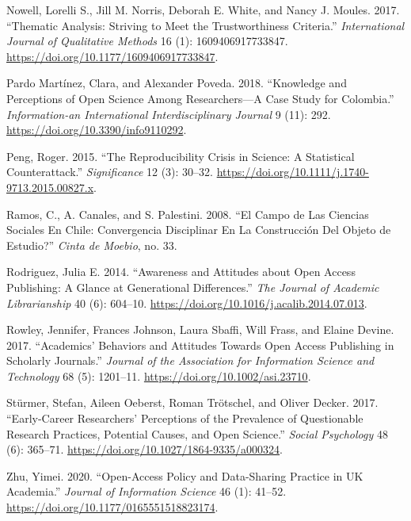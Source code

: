 \documentclass[
  letterpaper,
  DIV=11,
  numbers=noendperiod]{scrartcl}
\newlength{\cslhangindent}
\newlength{\cslentryspacingunit} %
\newenvironment{CSLReferences}[2] %
 {%
  \setlength{\parindent}{0pt}
  \ifodd #1
  \let\oldpar\par
  \def\par{\hangindent=\cslhangindent\oldpar}
  \fi
  \setlength{\parskip}{#2\cslentryspacingunit}
 }%
 {}
\begin{document}
\begin{CSLReferences}{1}{0}
\leavevmode{}%
Nowell, Lorelli S., Jill M. Norris, Deborah E. White, and Nancy J.
Moules. 2017. {``Thematic {Analysis}: {Striving} to {Meet} the
{Trustworthiness Criteria}.''} \emph{International Journal of
Qualitative Methods} 16 (1): 1609406917733847.
\url{https://doi.org/10.1177/1609406917733847}.

\leavevmode{}%
Pardo Martínez, Clara, and Alexander Poveda. 2018. {``Knowledge and
{Perceptions} of {Open Science} Among {Researchers}---{A Case Study} for
{Colombia}.''} \emph{Information-an International Interdisciplinary
Journal} 9 (11): 292. \url{https://doi.org/10.3390/info9110292}.

\leavevmode{}%
Peng, Roger. 2015. {``The Reproducibility Crisis in Science: {A}
Statistical Counterattack.''} \emph{Significance} 12 (3): 30--32.
\url{https://doi.org/10.1111/j.1740-9713.2015.00827.x}.

\leavevmode{}%
Ramos, C., A. Canales, and S. Palestini. 2008. {``El {Campo} de Las
{Ciencias Sociales} En {Chile}: {\textquestiondown}{Convergencia}
Disciplinar En La Construcci{ó}n Del Objeto de Estudio?''} \emph{Cinta
de Moebio}, no. 33.

\leavevmode{}%
Rodriguez, Julia E. 2014. {``Awareness and {Attitudes} about {Open
Access Publishing}: {A Glance} at {Generational Differences}.''}
\emph{The Journal of Academic Librarianship} 40 (6): 604--10.
\url{https://doi.org/10.1016/j.acalib.2014.07.013}.

\leavevmode{}%
Rowley, Jennifer, Frances Johnson, Laura Sbaffi, Will Frass, and Elaine
Devine. 2017. {``Academics' Behaviors and Attitudes Towards Open Access
Publishing in Scholarly Journals.''} \emph{Journal of the Association
for Information Science and Technology} 68 (5): 1201--11.
\url{https://doi.org/10.1002/asi.23710}.

\leavevmode{}%
Stürmer, Stefan, Aileen Oeberst, Roman Trötschel, and Oliver Decker.
2017. {``Early-{Career Researchers}' {Perceptions} of the {Prevalence}
of {Questionable Research Practices}, {Potential Causes}, and {Open
Science}.''} \emph{Social Psychology} 48 (6): 365--71.
\url{https://doi.org/10.1027/1864-9335/a000324}.

\leavevmode{}%
Zhu, Yimei. 2020. {``Open-Access Policy and Data-Sharing Practice in
{UK} Academia.''} \emph{Journal of Information Science} 46 (1): 41--52.
\url{https://doi.org/10.1177/0165551518823174}.

\end{CSLReferences}
\end{document}
